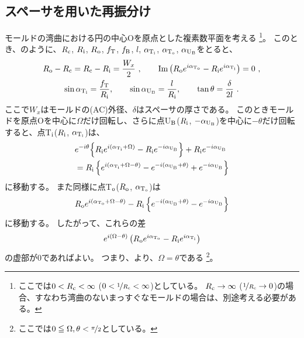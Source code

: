 \subsection{スペーサを用いた再振分け}
モールドの湾曲における円の中心Oを原点とした複素数平面を考える
\footnote{ここでは$0 < R_\text c < \infty$ ($0 < \nicefrac1{R_\text c} < \infty$)としている。
$R_\text c \to \infty$ ($\nicefrac1{R_\text c} \to 0$)の場合、すなわち湾曲のないまっすぐなモールドの場合は、別途考える必要がある。}。
このとき、のように、$R_\text c$, $R_\text i$, $R_\text o$, $f_\text T$, $f_\text B$, $l$, $\alpha_{\text T_\text i}$, $\alpha_{\text T_\text o}$, $\alpha_{\text U_\text B}$をとると、
\begin{subequations}
\begin{gather}
  \label{eq:constraintUpoint1}
  R_\text o - R_\text c = R_\text c - R_\text i = \frac{W_x}2~, \qquad
  \text{Im}\left(R_\text oe^{i\alpha_{\text T_\text o}} - R_\text ie^{i\alpha_{\text T_\text i}}\right) = 0~,\\
  \label{eq:constraintUpoint2}
  \sin\alpha_{\text T_\text i} = \frac{f_\text T}{R_\text i}, \qquad
  \sin\alpha_{\text U_\text B} = \frac l{R_\text i}, \qquad
  \tan\theta = \frac\delta{2l}~.
\end{gather}
\end{subequations}
ここで$W_x$はモールドの(AC)外径、$\delta$はスペーサの厚さである。
このときモールドを原点Oを中心に$\Omega$だけ回転し、さらに点U$_\text B$($R_\text i$, $-\alpha_{\text U_\text B}$)を中心に$-\theta$だけ回転すると、点T$_\text i$($R_\text i$, $\alpha_{\text T_\text i}$)は、
\begin{align}
  \notag
  & e^{-i\theta}\!\left\{R_\text ie^{i(\alpha_{\text T_\text i} + \Omega)} - R_\text ie^{-i\alpha_{\text U_\text B}}\right\}
    +R_\text ie^{-i\alpha_{\text U_\text B}}\\
  &= R_\text i
     \left\{
       e^{i(\alpha_{\text T_\text i} + \Omega - \theta)} - e^{-i(\alpha_{\text U_\text B} + \theta)} + e^{-i\alpha_{\text U_\text B}}
     \right\}
  \label{eq:afterftUpoint}
\end{align}
に移動する。
また同様に点T$_\text o$($R_\text o$, $\alpha_{\text T_\text o}$)は
\begin{equation}
  \notag
  R_\text oe^{i(\alpha_{\text T_\text o} + \Omega - \theta)} - R_\text i\left\{e^{-i(\alpha_{\text U_\text B} + \theta)} - e^{-i\alpha_{\text U_\text B}}\right\}
\end{equation}
に移動する。
したがって、これらの差
\begin{equation}
  \notag
  e^{i(\Omega - \theta)}\left(R_\text oe^{i\alpha_{\text T_\text o}} - R_\text ie^{i\alpha_{\text T_\text i}}\right)
\end{equation}
の虚部が$0$であればよい。
つまり、より、$\Omega = \theta$である
\footnote{ここでは$0 \leqq \Omega, \theta < \nicefrac \pi2$としている。}。

